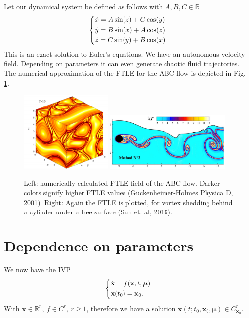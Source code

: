 \begin{ex}
	Let our dynamical system be defined as follows with $A,B,C \in \mathbb{R}$
\begin{align}
	\begin{dcases}
		\dot{x} = A \sin(z) + C \cos(y) \\
		\dot{y} = B \sin(x) + A \cos(z) \\
		\dot{z} = C \sin(y) + B \cos(x).
	\end{dcases}
\end{align}
This is an exact solution to Euler's equations.  We have an autonomous velocity field. Depending on parameters it can even generate chaotic fluid trajectories. The numerical approximation of the FTLE for the ABC flow is depicted in Fig. \ref{fig:FTLE_flows}.
\begin{figure}[h!]
	\centering
	\includegraphics[width=0.4\textwidth]{figures/ch1/14fluid1.png}
	\hspace{0.03\textwidth}
	\includegraphics[width=0.55\textwidth]{figures/ch1/15vortex_shedding.png}
	\caption{Left: numerically calculated FTLE field of the ABC flow. Darker colors signify higher FTLE values (Guckenheimer-Holmes Physica D, 2001). Right: Again the FTLE is plotted, for vortex shedding behind a cylinder under a free surface (Sun et. al, 2016).}
	\label{fig:FTLE_flows}
\end{figure}
\end{ex}
\vfill
\section{Dependence on parameters}
We now have the IVP
\begin{align}
	\begin{dcases}
		\dot{ \textbf{x}} = f( \textbf{x},t, \bm{\mu} ) \\  \textbf{x}(t_0) =  \textbf{x}_0.
	\end{dcases}
\end{align}
With $ \textbf{x} \in \mathbb{R}^{n},\ f\in C^r,\ r\geq 1$, therefore we have a solution $ \textbf{x}(t; t_0,  \textbf{x}_0,  \bm{\mu} ) \in C^r_{ \textbf{x}_0}$.

